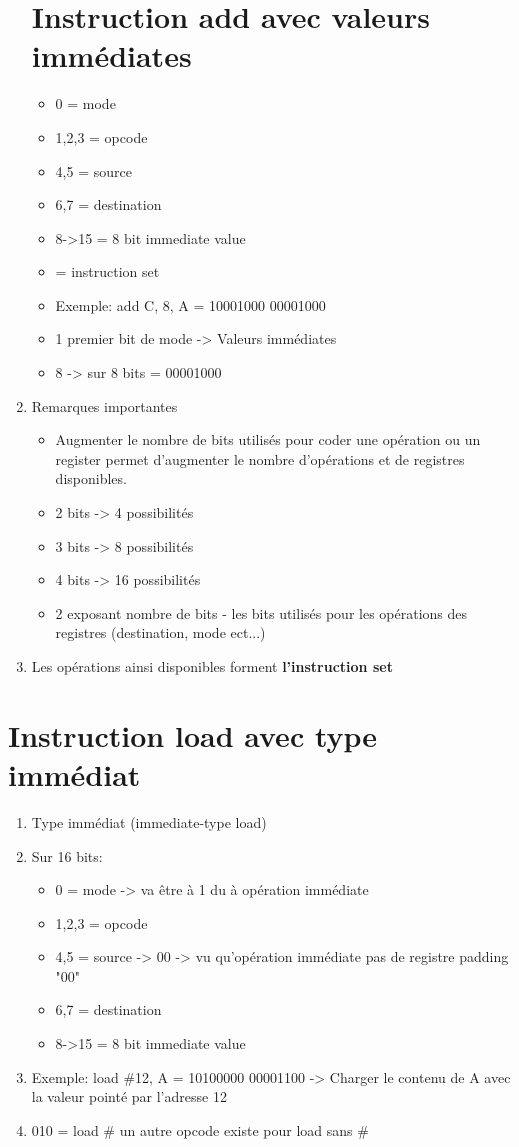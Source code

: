 \begin{enumerate}
\section{Instruction add avec valeurs immédiates}
\begin{itemize}
\item 0 = mode
\item 1,2,3 = opcode
\item 4,5 = source
\item 6,7 = destination
\item 8->15 = 8 bit immediate value
\item = instruction set
\end{itemize}
\begin{itemize}
  \item Exemple: add C, 8, A = 10001000 00001000
  \item 1 premier bit de mode -> Valeurs immédiates
  \item 8 -> sur 8 bits = 00001000
\end{itemize}
\item Remarques importantes
\begin{itemize}
  \item Augmenter le nombre de bits utilisés pour coder une opération ou un register permet d'augmenter le nombre d'opérations et de registres disponibles. 
  \item 2 bits -> 4 possibilités
  \item 3 bits -> 8 possibilités
  \item 4 bits -> 16 possibilités
  \item 2 exposant nombre de bits - les bits utilisés pour les opérations des registres (destination, mode ect...)
\end{itemize}
  \item Les opérations ainsi disponibles forment \textbf{l'instruction set}
\end{enumerate}

\section{Instruction load avec type immédiat}
\begin{enumerate}
\item Type immédiat (immediate-type load)
\item Sur 16 bits:
\begin{itemize}
  \item 0 = mode -> va être à 1 du à opération immédiate
  \item 1,2,3 = opcode
  \item 4,5 = source -> 00 -> vu qu'opération immédiate pas de registre padding "00"
  \item 6,7 = destination
  \item 8->15 = 8 bit immediate value
\end{itemize}
\item Exemple: load \#12, A = 10100000 00001100 -> Charger le contenu de A avec la valeur pointé par l'adresse 12
\item 010 = load \# un autre opcode existe pour load sans \#
\end{enumerate}

